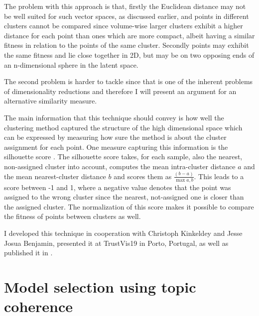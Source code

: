 The problem with this approach is that, firstly the Euclidean distance may not be well suited for such vector spaces, as discussed earlier, and points in different clusters cannot be compared since volume-wise larger clusters exhibit a higher distance for each point than ones which are more compact, albeit having a similar fitness in relation to the points of the same cluster. Secondly points may exhibit the same fitness and lie close together in 2D, but may be on two opposing ends of an n-dimensional sphere in the latent space. 

The second problem is harder to tackle since that is one of the inherent problems of dimensionality reductions and therefore I will present an argument for an alternative similarity measure.

The main information that this technique should convey is how well the clustering method captured the structure of the high dimensional space which can be expressed by measuring how sure the method is about the cluster assignment for each point. One measure capturing this information is the silhouette score \cite{rousseeuwSilhouettesGraphicalAid1987}. The silhouette score takes, for each sample, also the nearest, non-assigned cluster into account, computes the mean intra-cluster distance $a$ and the mean nearest-cluster distance $b$ and scores them as $\frac{(b-a)}{\max{a,b}}$. This leads to a score between -1 and 1, where a negative value denotes that the point was assigned to the wrong cluster since the nearest, not-assigned one is closer than the assigned cluster. The normalization of this score makes it possible to compare the fitness of points between clusters as well. 

I developed this technique in cooperation with Christoph Kinkeldey and Jesse Josua Benjamin, presented it at TrustVis19 in Porto, Portugal, as well as published it in \cite{christophkinkeldeySupportingInterpretabilityClustering2019}.


\section{Model selection using topic coherence}

